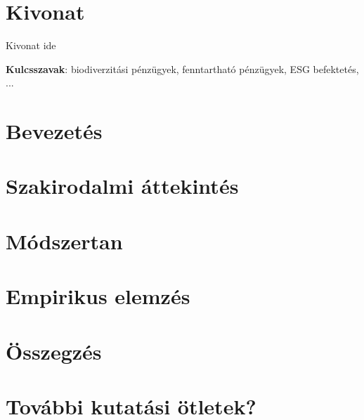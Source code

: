 \documentclass{bce-thesis}[12pt]
\begin{document}
\maketitle


\section*{Kivonat}
Kivonat ide

\bigskip
\noindent\textbf{Kulcsszavak}: biodiverzitási pénzügyek, fenntartható pénzügyek, ESG befektetés, ...


\section{Bevezetés}



\section{Szakirodalmi áttekintés}



\section{Módszertan}



\section{Empirikus elemzés}



\section{Összegzés}

\section{További kutatási ötletek?}

\cleardoublepage


\printbibliography[title=Irodalomjegyzék]

\listoffigures

\cleardoublepage

\nyilatkozat
\end{document}

